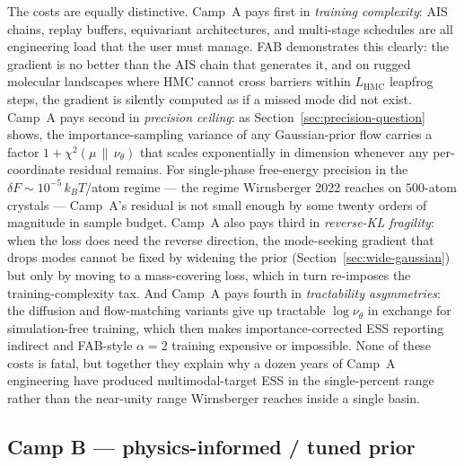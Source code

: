 \documentclass[11pt,letterpaper]{article}
\theoremstyle{plain}
\begin{document}
The costs are equally distinctive. Camp~A pays first in \emph{training
complexity}: AIS chains, replay buffers, equivariant architectures, and
multi-stage schedules are all engineering load that the user must manage.
FAB demonstrates this clearly: the gradient is no better than the AIS
chain that generates it, and on rugged molecular landscapes where HMC cannot
cross barriers within $L_{\mathrm{HMC}}$ leapfrog steps, the gradient is
silently computed as if a missed mode did not exist. Camp~A pays second in
\emph{precision ceiling}: as Section~\ref{sec:precision-question} shows,
the importance-sampling variance of any Gaussian-prior flow carries a factor
$1+\chi^2(\mu\,\|\,\nu_\theta)$ that scales exponentially in dimension
whenever any per-coordinate residual remains. For single-phase free-energy
precision in the $\delta F\sim 10^{-5}\,k_BT$/atom regime --- the regime
Wirnsberger 2022 reaches on $500$-atom crystals --- Camp~A's residual is
not small enough by some twenty orders of magnitude in sample budget. Camp~A
also pays third in \emph{reverse-KL fragility}: when the loss does need the
reverse direction, the mode-seeking gradient that drops modes cannot be
fixed by widening the prior (Section~\ref{sec:wide-gaussian}) but only by
moving to a mass-covering loss, which in turn re-imposes the
training-complexity tax. And Camp~A pays fourth in \emph{tractability
asymmetries}: the diffusion and flow-matching variants give up tractable
$\log\nu_\theta$ in exchange for simulation-free training, which then makes
importance-corrected ESS reporting indirect and FAB-style $\alpha=2$
training expensive or impossible. None of these costs is fatal, but
together they explain why a dozen years of Camp~A engineering have produced
multimodal-target ESS in the single-percent range rather than the
near-unity range Wirnsberger reaches inside a single basin.

\subsection*{Camp B --- physics-informed / tuned prior}
\end{document}
